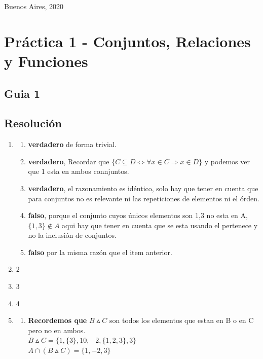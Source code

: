 \documentclass[12pt]{book}
\begin{document}
\noindent Buenos Aires, 2020

\newpage

\tableofcontents


\chapter{Práctica 1 - Conjuntos, Relaciones y Funciones}
\section{Guia 1}
%


\section{Resoluci\'on}
\begin{enumerate}
\item 
	\begin{enumerate}[i]
	\item \textbf{verdadero} de forma trivial.
	\item \textbf{verdadero}, Recordar que $ \{ C \subseteq D \Leftrightarrow \forall x \in C \Rightarrow x \in D \} $ y podemos ver 			que 1 esta en ambos connjuntos.
	\item \textbf{verdadero}, el razonamiento es id\'entico, solo hay que tener en cuenta que para conjuntos no es 				relevante 	ni las repeticiones de elementos ni el \'orden.
	\item \textbf{falso}, porque el conjunto cuyos \'unicos elementos son 1,3 no esta en A, $ \{ 1, 3\} \notin A $ aqui 			hay que tener en cuenta que se esta usando el pertenece y no la inclusi\'on de conjuntos.
	\item \textbf{falso} por la misma raz\'on que el item anterior.
	\end{enumerate}
\item 2
\item 3
\item 4
\item 	
	\begin{enumerate}[i]
	\item \textbf{Recordemos que} $B \vartriangle C $ son todos los elementos que estan en B o en C pero no en ambos.\\
		$B\vartriangle C = \{ 1, \{ 3 \}, 10, -2, \{1, 2, 3\}, 3 \} $ \\
		$ A\cap (B\vartriangle C ) = \{ 1, -2, 3\}$ \\ 
		

\end{enumerate}
\end{enumerate}
\end{document}
